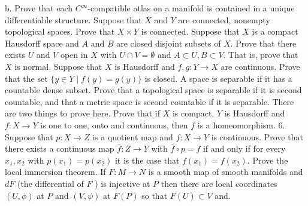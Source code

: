 \documentclass[14pt]{extarticle}
\begin{document}
b. Prove that each $C^{\infty}$-compatible atlas on a manifold is contained in a unique differentiable structure.
\newpage
   Suppose that $X$ and $Y$ are connected, nonempty topological spaces. Prove that $X \times Y$ is connected.
\newpage
   Suppose that $X$ is a compact Hausdorff space and $A$ and $B$ are closed disjoint subsets of $X$. Prove that there exists $U$ and $V$ open in $X$ with $U \cap V=\emptyset$ and $A \subset U, B \subset V$. That is, prove that $X$ is normal.
\newpage
   Suppose that $X$ is Hausdorff and $f, g: Y \rightarrow X$ are continuous. Prove that the set $\{y \in Y \mid f(y)=g(y)\}$ is closed.
\newpage
   A space is separable if it has a countable dense subset. Prove that a topological space is separable if it is second countable, and that a metric space is second countable if it is separable. There are two things to prove here.
\newpage
   Prove that if $X$ is compact, $Y$ is Hausdorff and $f: X \rightarrow Y$ is one to one, onto and continuous, then $f$ is a homeomorphism. 6. Suppose that $p: X \rightarrow Z$ is a quotient map and $f: X \rightarrow Y$ is continuous. Prove that there exists a continuous map $\bar{f}: Z \rightarrow Y$ with $\bar{f} \circ p=f$ if and only if for every $x_{1}, x_{2}$ with $p\left(x_{1}\right)=p\left(x_{2}\right)$ it is the case that $f\left(x_{1}\right)=f\left(x_{2}\right)$.
\newpage
 Prove the local immersion theorem. If $F: M \rightarrow N$ is a smooth map of smooth manifolds and $d F$ (the differential of $F$ ) is injective at $P$ then there are local coordinates $(U, \phi)$ at $P$ and $(V, \psi)$ at $F(P)$ so that $F(U) \subset V$ and.
\end{document}
